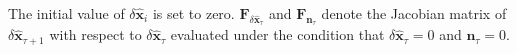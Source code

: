 The initial value of $\delta \widehat{\textbf{x}}_{i}$ is set to zero. $\textbf{F}_{\delta \widehat{\textbf{x}}_{\tau}}$ and $\textbf{F}_{\textbf{n}_\tau}$ denote the Jacobian matrix of $\delta \widehat{\textbf{x}}_{\tau+1}$ with respect to $\delta \widehat{\textbf{x}}_{\tau}$ evaluated under the condition that $\delta \widehat{\textbf{x}}_{\tau}=0$ and $\textbf{n}_\tau=0$.

